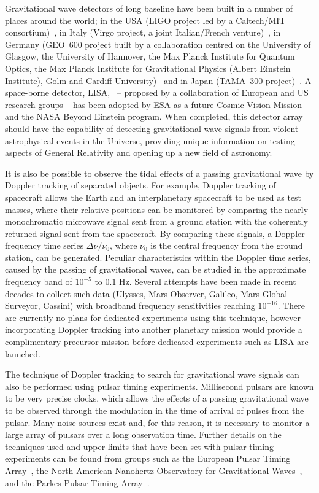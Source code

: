 \documentclass{article}
\begin{document}
Gravitational wave detectors of long baseline have been built in a number of
places around the world; in the USA (LIGO project led by a Caltech/MIT
consortium)~\cite{LIGOS5, LIGOweb}, in Italy (Virgo project, a joint
Italian/French venture)~\cite{Acernese:2007, Virgoweb}, in Germany (GEO~600
project built by a collaboration centred on the University of Glasgow, the
University of Hannover, the Max Planck Institute for Quantum Optics, the Max
Planck Institute for Gravitational Physics (Albert Einstein Institute), Golm and
Cardiff University)~\cite{Willke:2007, GEOweb} and in Japan (TAMA~300
project)~\cite{TAMAStatus, TAMAweb}. A space-borne detector, LISA,~\cite{LISA,
NASAweb, ESAweb} -- proposed by a collaboration of European and US research
groups -- has been adopted by ESA as a future Cosmic Vision Mission and the NASA
Beyond Einstein program. When completed, this detector array should have the
capability of detecting gravitational wave signals from violent astrophysical
events in the Universe, providing unique information on testing aspects of
General Relativity and opening up a new field of astronomy.

It is also be possible to observe the tidal effects of a passing gravitational wave by Doppler tracking of separated objects.  For example, Doppler tracking of spacecraft allows the Earth and an interplanetary spacecraft to be used as test masses, where their relative positions can be monitored by comparing the nearly monochromatic microwave signal sent from a ground station with the coherently returned signal sent from the spacecraft.  By comparing these signals, a Doppler frequency time series $\Delta \nu / \nu_0$, where $\nu_0$ is the central frequency from the ground station, can be generated.  Peculiar characteristics within the Doppler time series, caused by the passing of gravitational waves, can be studied in the approximate frequency band of $10^{-5}$ to $0.1$ Hz.  Several attempts have been made in recent decades to collect such data (Ulysses, Mars Observer, Galileo, Mars Global Surveyor, Cassini) with broadband frequency sensitivities reaching $10^{-16}$. There are currently no plans for dedicated experiments using this technique, however incorporating Doppler tracking into another planetary mission would provide a complimentary precursor mission before dedicated experiments such as LISA are launched.

The technique of Doppler tracking to search for gravitational wave signals can also be performed using pulsar timing experiments.  Millisecond pulsars \cite{Lorimer:2008} are known to be very precise clocks, which allows the effects of a passing gravitational wave to be observed through the modulation in the time of arrival of pulses from the pulsar.  Many noise sources exist and, for this reason, it is necessary to monitor a large array of pulsars over a long observation time.  Further details on the techniques used and upper limits that have been set with pulsar timing experiments can be found from groups such as the European Pulsar Timing Array~\cite{Janssen:2008}, the North American Nanohertz Observatory for Gravitational Waves~\cite{Jenet:2006,Jenet:2009}, and the Parkes Pulsar Timing Array~\cite{Hobbs:2008}.
\end{document}

